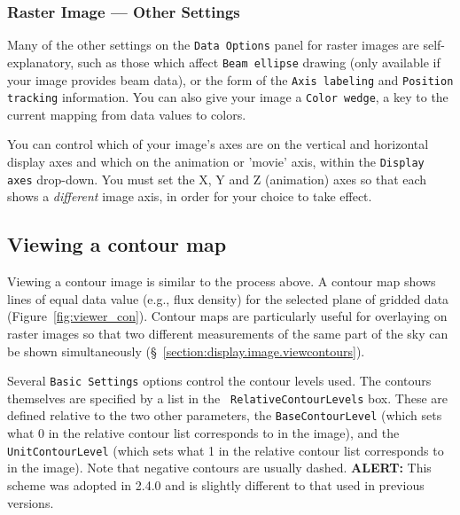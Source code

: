 \subsubsection{Raster Image --- Other Settings}
\label{section:display.image.raster.adjust.other}

Many of the other settings on the {\tt Data Options} panel for raster images
are self-explanatory, such as those which affect {\tt Beam ellipse} drawing
(only available if your image provides beam data), or the form of the
{\tt Axis labeling} and {\tt Position tracking} information.  You can also
give your image a {\tt Color wedge}, a key to the current mapping from data
values to colors.

You can control which of your image's axes are on the vertical and horizontal
display axes and which on the animation or 'movie' axis, within the
{\tt Display axes} drop-down.  You must set the X, Y and Z (animation) axes
so that each shows a {\it different} image axis, in order for your choice
to take effect.





\subsection{Viewing a contour map}
\label{section:display.image.contour}

Viewing a contour image is similar to the process above. A contour map
shows lines of equal data value (e.g., flux density) for the
selected plane of gridded data (Figure~\ref{fig:viewer_con}).
Contour maps are particularly useful for overlaying on raster images so
that two different measurements of the same part of the sky can be shown
simultaneously (\S~\ref{section:display.image.viewcontours}).

Several {\tt Basic Settings} options control the contour levels used.
The contours themselves are specified by a list in the {\tt
  RelativeContourLevels} box.  These are defined relative to the two
other parameters, the {\tt BaseContourLevel} (which sets what 0 in the
relative contour list corresponds to in the image), and the {\tt
  UnitContourLevel} (which sets what 1 in the relative contour list
corresponds to in the image).  Note that negative contours are usually
dashed. 
 {\bf ALERT:} This scheme was
adopted in 2.4.0 and is slightly different to that used in previous
versions.

